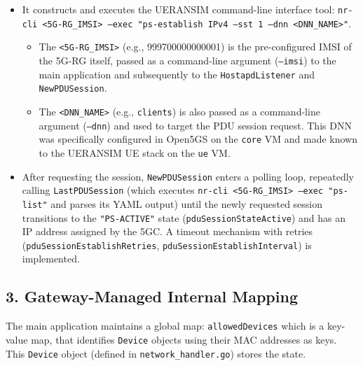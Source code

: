 \begin{itemize}
    \item{ 
        It constructs and executes the UERANSIM command-line interface tool: \texttt{nr-cli <5G-RG\_IMSI> --exec "ps-establish IPv4 --sst 1 --dnn <DNN\_NAME>"}.
        \begin{itemize}
            \item The \texttt{<5G-RG\_IMSI>} (e.g., 999700000000001) is the pre-configured \ac{IMSI} of the \ac{5G-RG} itself, passed as a command-line argument (\texttt{--imsi}) to the main application and subsequently to the \texttt{HostapdListener} and \texttt{NewPDUSession}.
            \item The \texttt{<DNN\_NAME>} (e.g., \texttt{clients}) is also passed as a command-line argument (\texttt{--dnn}) and used to target the \ac{PDU} session request. This \ac{DNN} was specifically configured in Open5GS on the \texttt{core} \ac{VM} and made known to the UERANSIM \ac{UE} stack on the \texttt{ue} \ac{VM}.
        \end{itemize}
    }
    \item After requesting the session, \texttt{NewPDUSession} enters a polling loop, repeatedly calling \texttt{LastPDUSession} (which executes \texttt{nr-cli <5G-RG\_IMSI> --exec "ps-list"} and parses its YAML output) until the newly requested session transitions to the \texttt{"PS-ACTIVE"} state (\texttt{pduSessionStateActive}) and has an \ac{IP} address assigned by the \ac{5GC}. A timeout mechanism with retries (\texttt{pduSessionEstablishRetries}, \texttt{pduSessionEstablishInterval}) is implemented.
\end{itemize}

\subsection{3. Gateway-Managed Internal Mapping}

The main application maintains a global map: \texttt{allowedDevices} which is a key-value map, that identifies \texttt{Device} objects using their \ac{MAC} addresses as keys. This \texttt{Device} object (defined in \texttt{network\_handler.go}) stores the state.

